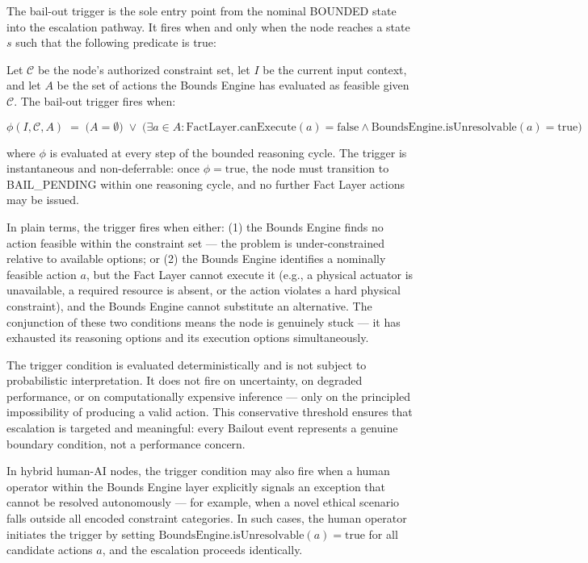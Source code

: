 The bail-out trigger is the sole entry point from the nominal BOUNDED state into the escalation pathway. It fires when and only when the node reaches a state $s$ such that the following predicate is true:

\begin{definition}
\label{def:bailout-trigger}
Let $\mathcal{C}$ be the node's authorized constraint set, let $I$ be the current input context, and let $A$ be the set of actions the Bounds Engine has evaluated as feasible given $\mathcal{C}$. The bail-out trigger fires when:

\begin{equation}
\label{eq:bailout-trigger}
\phi(I, \mathcal{C}, A) \;=\; \bigl( A = \emptyset \bigr) \;\lor\; \bigl( \exists a \in A: \text{FactLayer.canExecute}(a) = \text{false} \land \text{BoundsEngine.isUnresolvable}(a) = \text{true} \bigr)
\end{equation}

\noindent where $\phi$ is evaluated at every step of the bounded reasoning cycle. The trigger is instantaneous and non-deferrable: once $\phi = \text{true}$, the node must transition to BAIL\_PENDING within one reasoning cycle, and no further Fact Layer actions may be issued.
\end{definition}

In plain terms, the trigger fires when either: (1) the Bounds Engine finds no action feasible within the constraint set — the problem is under-constrained relative to available options; or (2) the Bounds Engine identifies a nominally feasible action $a$, but the Fact Layer cannot execute it (e.g., a physical actuator is unavailable, a required resource is absent, or the action violates a hard physical constraint), and the Bounds Engine cannot substitute an alternative. The conjunction of these two conditions means the node is genuinely stuck — it has exhausted its reasoning options and its execution options simultaneously.

The trigger condition is evaluated deterministically and is not subject to probabilistic interpretation. It does not fire on uncertainty, on degraded performance, or on computationally expensive inference — only on the principled impossibility of producing a valid action. This conservative threshold ensures that escalation is targeted and meaningful: every Bailout event represents a genuine boundary condition, not a performance concern.

\begin{note}
In hybrid human-AI nodes, the trigger condition may also fire when a human operator within the Bounds Engine layer explicitly signals an exception that cannot be resolved autonomously — for example, when a novel ethical scenario falls outside all encoded constraint categories. In such cases, the human operator initiates the trigger by setting $\text{BoundsEngine.isUnresolvable}(a) = \text{true}$ for all candidate actions $a$, and the escalation proceeds identically.
\end{note}

